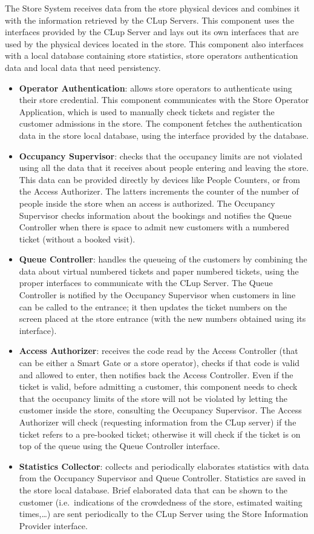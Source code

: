 The Store System receives data from the store physical devices and combines it with the information retrieved by the CLup Servers. This component uses the interfaces provided by the CLup Server and lays out its own interfaces that are used by the physical devices located in the store. This component also interfaces with a local database containing store statistics, store operators authentication data and local data that need persistency.

\begin{itemize}
    \item \textbf{Operator Authentication}: allows store operators to authenticate using their store credential. This component communicates with the Store Operator Application, which is used to manually check tickets and register the customer admissions in the store. The component fetches the authentication data in the store local database, using the interface provided by the database.
    \item \textbf{Occupancy Supervisor}: checks that the occupancy limits are not violated using all the data that it receives about people entering and leaving the store. This data can be provided directly by devices like People Counters, or from the Access Authorizer. The latters increments the counter of the number of people inside the store when an access is authorized. The Occupancy Supervisor checks information about the bookings and notifies the Queue Controller when there is space to admit new customers with a numbered ticket (without a booked visit).
    \item \textbf{Queue Controller}: handles the queueing of the customers by combining the data about virtual numbered tickets and paper numbered tickets, using the proper interfaces to communicate with the CLup Server. The Queue Controller is notified by the Occupancy Supervisor when customers in line can be called to the entrance; it then updates the ticket numbers on the screen placed at the store entrance (with the new numbers obtained using its interface).
    \item \textbf{Access Authorizer}: receives the code read by the Access Controller (that can be either a Smart Gate or a store operator), checks if that code is valid and allowed to enter, then notifies back the Access Controller. Even if the ticket is valid, before admitting a customer, this component needs to check that the occupancy limits of the store will not be violated by letting the customer inside the store, consulting the Occupancy Supervisor. The Access Authorizer will check (requesting information from the CLup server) if the ticket refers to a pre-booked ticket; otherwise it will check if the ticket is on top of the queue using the Queue Controller interface.
    \item \textbf{Statistics Collector}: collects and periodically elaborates statistics with data from the Occupancy Supervisor and Queue Controller. Statistics are saved in the store local database. Brief elaborated data that can be shown to the customer (i.e.~indications of the crowdedness of the store, estimated waiting times,\ldots) are sent periodically to the CLup Server using the Store Information Provider interface.
\end{itemize}

